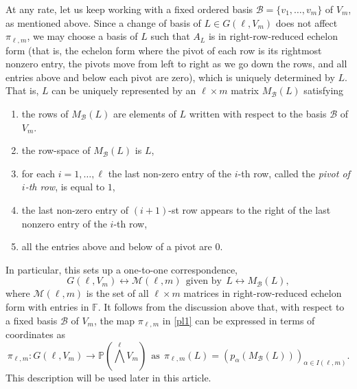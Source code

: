 \documentclass[10pt,a4paper,oneside]{amsproc}
\newcommand{\B}{\mathcal{B}}
\newcommand{\M}{\mathcal{M}}
\def\a{{\alpha}}
\def\FF{{\mathbb F}}
\def\PP{{\mathbb P}}
\begin{document}
At any rate, let us keep working with a fixed ordered basis $\B = \{v_1, \dots, v_m\}$ of $V_m$, as mentioned above. Since a change of basis of $L \in G(\ell, V_m)$ does not affect $\pi_{\ell, m}$, we may choose a basis of $L$ such that $A_L$ is in right-row-reduced echelon form (that is, the echelon form where the pivot of each row is its rightmost nonzero entry, the pivots move from left to right as we go down the rows, and all entries above and below each pivot are zero), which is uniquely determined by $L$. That is, $L$ can be uniquely represented by an $\ell \times m$ matrix  $M_{\B}(L)$ satisfying
\begin{enumerate}
    \item[(a)] the rows of $M_{\B}(L)$ are elements of $L$ written with respect to the basis $\mathcal{B}$ of $V_m$.
    \item[(b)]  the row-space of $M_{\B}(L)$ is $L$, 
    \item[(c)] for each $i = 1, \dots, \ell$ the last non-zero entry of the $i$-th row, called the \emph{pivot of $i$-th row}, is equal to $1$,
    \item[(d)] the last non-zero entry of $(i+1)$-st row appears to the right of the last nonzero entry of the $i$-th row,
    \item[(e)] all the entries above and below of a pivot are $0$. 
\end{enumerate}
 In particular,  this sets up a one-to-one correspondence,
\begin{equation}\label{em}
    G(\ell, V_m) \longleftrightarrow \M (\ell, m) \ \ \text{given by} \ \ L \longleftrightarrow M_{\B}(L),
\end{equation}
where $\M (\ell, m)$ is the set of all $\ell \times m$ matrices in right-row-reduced echelon form with entries in $\FF$. 
It follows from the discussion above that, with respect to a fixed basis $\B$ of $V_m$, the map $\pi_{\ell, m}$ in \eqref{pl1} can be expressed in terms of coordinates  as 
\begin{equation}\label{pl2}
    \pi_{\ell, m}: G (\ell, V_m) \to \PP\left(\bigwedge^\ell V_m\right) \ \ \text{as} \ \ \pi_{\ell, m} (L) = (p_\a (M_{\B}(L)))_{\a \in I(\ell, m)}.
\end{equation}
This description will be used later in this article. 
\end{document}
